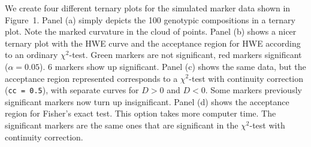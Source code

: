 \documentclass[a4paper]{article}
\begin{document}
We create four different ternary plots for the simulated marker data shown in Figure~1. Panel
(a) simply depicts the 100 genotypic compositions in a ternary plot. Note the marked curvature
in the cloud of points. Panel (b) shows a nicer ternary plot with the HWE curve and the acceptance region 
for HWE according to an ordinary $\chi^2$-test. Green markers are not significant, red markers significant 
($\alpha = 0.05$). 6 markers show up significant. Panel (c) shows the same data, but the acceptance region 
represented corresponds
to a $\chi^2$-test with continuity correction ({\tt cc = 0.5}), with separate curves for $D>0$ and $D<0$. 
Some markers previously significant markers now turn
up insignificant. Panel (d) shows the acceptance region for Fisher's exact test. This option takes
more computer time. The significant markers are the same ones that are significant in the $\chi^2$-test with
continuity correction. 
\end{document}
